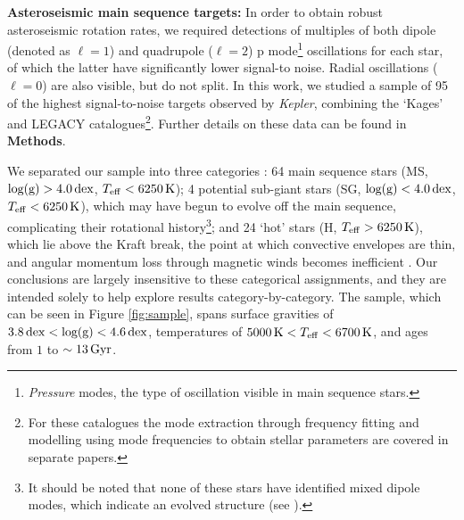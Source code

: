 \documentclass[12pt]{article}
\begin{document}
\textbf{Asteroseismic main sequence targets:} In order to obtain robust asteroseismic rotation rates, we required detections of multiples of both dipole (denoted as $\ell = 1$) and quadrupole ($\ell = 2$) p mode\footnote{\textit{Pressure} modes, the type of oscillation visible in main sequence stars.} oscillations for each star, of which the latter have significantly lower signal-to noise. Radial oscillations ($\ell = 0$) are also visible, but do not split. In this work, we studied a sample of 95 of the highest signal-to-noise targets observed by \textit{Kepler}, combining the `Kages' \cite{silvaaguirre+2015,davies+2016} and LEGACY \cite{lund+2017, silvaaguirre+2017} catalogues\footnote{For these catalogues the mode extraction through frequency fitting \cite{davies+2016, lund+2017} and modelling using mode frequencies to obtain stellar parameters \cite{silvaaguirre+2015, silvaaguirre+2017} are covered in separate papers.}. Further details on these data can be found in \textbf{Methods}. 

We separated our sample into three categories \cite{garcia+2014}: 64 main sequence stars (MS, $\rm{log(g)} > 4.0\, \rm dex$, $T_{\rm eff} < 6250\, \rm K$); 4 potential sub-giant stars (SG, $\rm{log(g)} < 4.0\, \rm dex$, $T_{\rm eff} < 6250\, \rm K$), which may have begun to evolve off the main sequence, complicating their rotational history\footnote{It should be noted that none of these stars have identified mixed dipole modes, which indicate an evolved structure (see \cite{bedding+2010}).}; and 24 `hot' stars (H, $T_{\rm eff} > 6250\, \rm K$), which lie above the Kraft break, the point at which convective envelopes are thin, and angular momentum loss through magnetic winds becomes inefficient \cite{kraft1967}. Our conclusions are largely insensitive to these categorical assignments, and they are intended solely to help explore results category-by-category. The sample, which can be seen in Figure \ref{fig:sample}, spans surface gravities of $3.8\, \rm{dex} < \rm{log(g)} < 4.6\, \rm{dex}$, temperatures of $5000\, \textrm{K} < T_{\rm eff} <  6700\, \rm{K}$, and ages from $1$ to $\sim 13\, \rm{Gyr}$.\\
\end{document}
